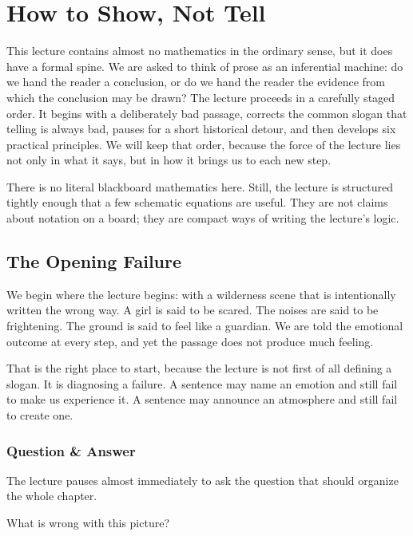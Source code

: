 \chapter{How to Show, Not Tell}

This lecture contains almost no mathematics in the ordinary sense, but it does have a formal spine. We are asked to think of prose as an inferential machine: do we hand the reader a conclusion, or do we hand the reader the evidence from which the conclusion may be drawn? The lecture proceeds in a carefully staged order. It begins with a deliberately bad passage, corrects the common slogan that telling is always bad, pauses for a short historical detour, and then develops six practical principles. We will keep that order, because the force of the lecture lies not only in what it says, but in how it brings us to each new step.

\begin{remark}
There is no literal blackboard mathematics here. Still, the lecture is structured tightly enough that a few schematic equations are useful. They are not claims about notation on a board; they are compact ways of writing the lecture's logic.
\end{remark}

\section{The Opening Failure}

We begin where the lecture begins: with a wilderness scene that is intentionally written the wrong way. A girl is said to be scared. The noises are said to be frightening. The ground is said to feel like a guardian. We are told the emotional outcome at every step, and yet the passage does not produce much feeling.

That is the right place to start, because the lecture is not first of all defining a slogan. It is diagnosing a failure. A sentence may name an emotion and still fail to make us experience it. A sentence may announce an atmosphere and still fail to create one.

\subsection{Question \& Answer}

The lecture pauses almost immediately to ask the question that should organize the whole chapter.

What is wrong with this picture?

